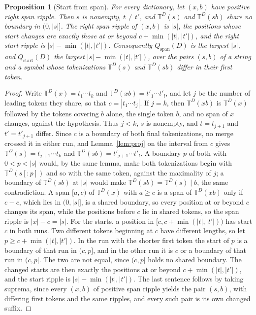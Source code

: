 \documentclass[11pt,a4paper]{article}
\theoremstyle{definition}
\theoremstyle{plain}
\newtheorem{proposition}{Proposition}
\newcommand{\T}{\mathbb{T}}
\begin{document}
\begin{proposition}[Start from span]\label{prop:startspan}
For every dictionary, let \((x, b)\) have positive right span ripple. Then \(s\) is nonempty, \(t \ne t'\), and
\(\T^D(s)\) and \(\T^D(sb)\) share no boundary in \((0, |s|]\). The right span ripple of \((x, b)\) is \(|s|\), the
positions whose start changes are exactly those at or beyond \(c + \min(|t|, |t'|)\), and the right start ripple is
\(|s| - \min(|t|, |t'|)\). Consequently \(Q_{\mathrm{span}}(D)\) is the largest \(|s|\), and \(Q_{\mathrm{start}}(D)\)
the largest \(|s| - \min(|t|, |t'|)\), over the pairs \((s, b)\) of a string and a symbol whose tokenizations
\(\T^D(s)\) and \(\T^D(sb)\) differ in their first token.
\end{proposition}

\begin{proof}
Write \(\T^D(x) = t_1 \cdots t_k\) and \(\T^D(xb) = t'_1 \cdots t'_l\), and let \(j\) be the number of leading tokens
they share, so that \(c = |t_1 \cdots t_j|\). If \(j = k\), then \(\T^D(xb)\) is \(\T^D(x)\) followed by the tokens
covering \(b\) alone, the single token \(b\), and no span of \(x\) changes, against the hypothesis. Thus \(j < k\),
\(s\) is nonempty, and \(t = t_{j+1}\) and \(t' = t'_{j+1}\) differ. Since \(c\) is a boundary of both final
tokenizations, no merge crossed it in either run, and Lemma~\ref{lem:proj} on the interval from \(c\) gives
\(\T^D(s) = t_{j+1} \cdots t_k\) and \(\T^D(sb) = t'_{j+1} \cdots t'_l\). A boundary \(p\) of both with \(0 < p < |s|\)
would, by the same lemma, make both tokenizations begin with \(\T^D(s[{:}p])\) and so with the same token, against the
maximality of \(j\); a boundary of \(\T^D(sb)\) at \(|s|\) would make \(\T^D(sb) = \T^D(s) \mid b\), the same
contradiction. A span \([a, e)\) of \(\T^D(x)\) with \(a \ge c\) is a span of \(\T^D(xb)\) only if \(e - c\), which lies
in \((0, |s|]\), is a shared boundary, so every position at or beyond \(c\) changes its span, while the positions before
\(c\) lie in shared tokens, so the span ripple is \(|x| - c = |s|\). For the starts, a position in
\([c, c + \min(|t|, |t'|))\) has start \(c\) in both runs. Two different tokens beginning at \(c\) have different
lengths, so let \(p \ge c + \min(|t|, |t'|)\). In the run with the shorter first token the start of \(p\) is a boundary
of that run in \((c, p]\), and in the other run it is \(c\) or a boundary of that run in \((c, p]\). The two are not
equal, since \((c, p]\) holds no shared boundary. The changed starts are then exactly the positions at or beyond
\(c + \min(|t|, |t'|)\), and the start ripple is \(|s| - \min(|t|, |t'|)\). The last sentence follows by taking suprema,
since every \((x, b)\) of positive span ripple yields the pair \((s, b)\), with differing first tokens and the same
ripples, and every such pair is its own changed suffix.
\end{proof}
\end{document}
